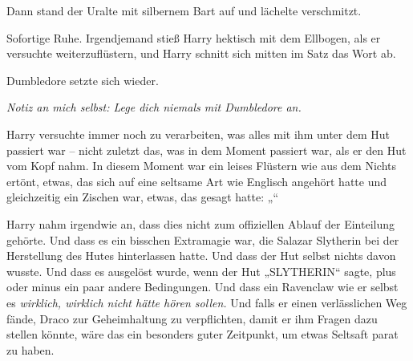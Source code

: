 Dann stand der Uralte mit silbernem Bart auf und lächelte verschmitzt.

Sofortige Ruhe. Irgendjemand stieß Harry hektisch mit dem Ellbogen, als er versuchte weiterzuflüstern, und Harry schnitt sich mitten im Satz das Wort ab.

Dumbledore setzte sich wieder.

\emph{Notiz an mich selbst: Lege dich niemals mit Dumbledore an.}

Harry versuchte immer noch zu verarbeiten, was alles mit ihm unter dem Hut passiert war – nicht zuletzt das, was in dem Moment passiert war, als er den Hut vom Kopf nahm. In diesem Moment war ein leises Flüstern wie aus dem Nichts ertönt, etwas, das sich auf eine seltsame Art wie Englisch angehört hatte und gleichzeitig ein Zischen war, etwas, das gesagt hatte: „“

Harry nahm irgendwie an, dass dies nicht zum offiziellen Ablauf der Einteilung gehörte. Und dass es ein bisschen Extramagie war, die Salazar Slytherin bei der Herstellung des Hutes hinterlassen hatte. Und dass der Hut selbst nichts davon wusste. Und dass es ausgelöst wurde, wenn der Hut „SLYTHERIN“ sagte, plus oder minus ein paar andere Bedingungen. Und dass ein Ravenclaw wie er selbst es \emph{wirklich, wirklich nicht hätte hören sollen.} Und falls er einen verlässlichen Weg fände, Draco zur Geheimhaltung zu verpflichten, damit er ihm Fragen dazu stellen könnte, wäre das ein besonders guter Zeitpunkt, um etwas Seltsaft parat zu haben.

